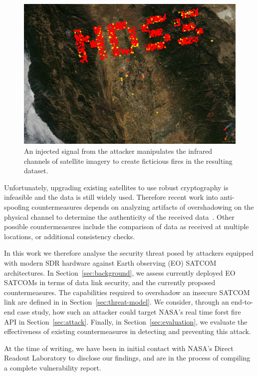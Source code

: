 \begin{figure}
    \includegraphics[width=\columnwidth]{diagrams/injection/pixels_800_140.jpg}
    \caption{An injected signal from the attacker manipulates the infrared channels of satellite imagery to create ficticious fires in the resulting dataset.}
    \label{fig:location-injection}
\end{figure}


Unfortunately, upgrading existing satellites to use robust cryptography is infeasible and the data is still widely used.
Therefore recent work into anti-spoofing countermeasures depends on analyzing artifacts of overshadowing on the physical channel to determine the authenticity of the received data~\cite{jedermann2021orbit,oligeri2020past}.
Other possible countermeasures include the comparison of data as received at multiple locations, or additional consistency checks.

In this work we therefore analyse the security threat posed by attackers equipped with modern SDR hardware against Earth observing (EO) SATCOM architectures.
In Section~\ref{sec:background}, we assess currently deployed EO SATCOMs in terms of data link security, and the currently proposed countermeasures.
The capabilities required to overshadow an insecure SATCOM link are defined in in Section~\ref{sec:threat-model}.
We consider, through an end-to-end case study, how such an attacker could target NASA's real time forst fire API in Section~\ref{sec:attack}.
Finally, in Section~\ref{sec:evaluation}, we evaluate the effectiveness of existing countermeasures in detecting and preventing this attack.

At the time of writing, we have been in initial contact with NASA's Direct Readout Laboratory to disclose our findings, and are in the process of compiling a complete vulnerability report.
